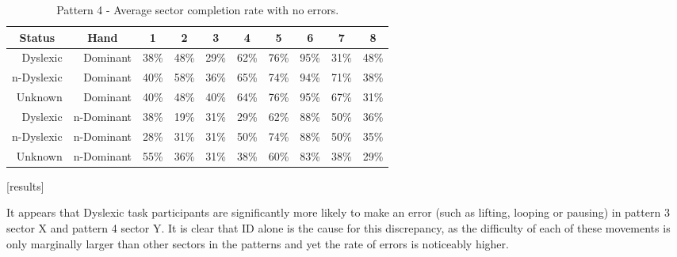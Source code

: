 		\begin{table}[]
			\centering
			\caption{Pattern 4 - Average sector completion rate with no errors.}
			\label{tab_pat_4_com}
			\begin{tabularx}{\textwidth}{|r|r|X|X|X|X|X|X|X|X|}
			\hline
			\multicolumn{1}{|c|}{\textbf{Status}} & \multicolumn{1}{c|}{\textbf{Hand}} & \multicolumn{1}{c|}{\textbf{1}} & \multicolumn{1}{c|}{\textbf{2}} & \multicolumn{1}{c|}{\textbf{3}} & \multicolumn{1}{c|}{\textbf{4}} & \multicolumn{1}{c|}{\textbf{5}} & \multicolumn{1}{c|}{\textbf{6}} & \multicolumn{1}{c|}{\textbf{7}} & \multicolumn{1}{c|}{\textbf{8}}\\ \hline
				Dyslexic                              & Dominant                           & 38\%       & 48\%       & 29\%       & 62\%       & 76\%       & 95\%       & 31\%       & 48\%       \\ \hline
				n-Dyslexic                          & Dominant                           & 40\%       & 58\%       & 36\%       & 65\%       & 74\%       & 94\%       & 71\%       & 38\%       \\ \hline
				Unknown                    & Dominant                           & 40\%       & 48\%       & 40\%       & 64\%       & 76\%       & 95\%       & 67\%       & 31\%       \\ \hline
				Dyslexic                              & n-Dominant                       & 38\%       & 19\%       & 31\%       & 29\%       & 62\%       & 88\%       & 50\%       & 36\%       \\ \hline
				n-Dyslexic                          & n-Dominant                       & 28\%       & 31\%       & 31\%       & 50\%       & 74\%       & 88\%       & 50\%       & 35\%       \\ \hline
				Unknown                    & n-Dominant                       & 55\%       & 36\%       & 31\%       & 38\%       & 60\%       & 83\%       & 38\%       & 29\%       \\ \hline
			\end{tabularx}
		\end{table}
		[results]
		
		It appears that Dyslexic task participants are significantly more likely to make an error (such as lifting, looping or pausing) in pattern 3 sector X and pattern 4 sector Y. It is clear that ID alone is the cause for this discrepancy, as the difficulty of each of these movements is only marginally larger than other sectors in the patterns and yet the rate of errors is noticeably higher.
		
